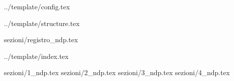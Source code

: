  {../template/config.tex}


\def\DOCUMENTO{Norme di Progetto}
\def\VERSIONE{1.0.0}

\def\REDATTORE {Enrico Chiara\\ & Gino Zaidan\\ & Riccardo Rizzo}
\def\VERIFICATORE {Federico Rossetto\\ & Riccardo Rizzo}
\def\RESPONSABILE {Alberto Andriolo}

\def\USO {Interno}

\def\DISTRIBUZIONE {\GRUPPO{}\\ & \COMMITTENTE{}\\}

\def\DESCRIZIONE {Documento contenente l'insieme di norme rispettate dal gruppo \GRUPPO\ per la realizzazione del progetto \PROGETTO}


\def\INDICE	{true}
\def\TABELLE {false}
\def\FIGURE {true}


 {../template/structure.tex}

 {sezioni/registro_ndp.tex}

 {../template/index.tex}

 {sezioni/1_ndp.tex}
 {sezioni/2_ndp.tex}
 {sezioni/3_ndp.tex}
 {sezioni/4_ndp.tex}





